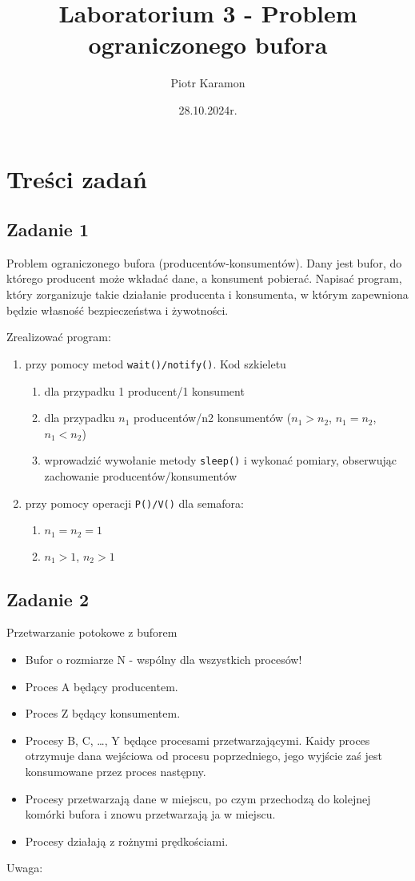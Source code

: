 \documentclass[11pt]{article}
\author{Piotr Karamon}
\date{28.10.2024r.}
\title{Laboratorium 3 - Problem ograniczonego bufora}
\begin{document}
\maketitle
\section*{Treści zadań}
\label{sec:org3d0abb9}
\subsection*{Zadanie 1}
\label{sec:org9805b07}
Problem ograniczonego bufora (producentów-konsumentów). Dany jest bufor, do
którego producent może wkładać dane, a konsument pobierać. Napisać program,
który zorganizuje takie działanie producenta i konsumenta, w którym zapewniona
będzie własność bezpieczeństwa i żywotności.

Zrealizować program:

\begin{enumerate}
\item przy pomocy metod \texttt{wait()/notify()}. Kod szkieletu
\begin{enumerate}
\item dla przypadku 1 producent/1 konsument
\item dla przypadku \(n_1\) producentów/n2 konsumentów (\(n_1>n_2\), \(n_1=n_2\), \(n_1<n_2\))
\item wprowadzić wywołanie metody \texttt{sleep()} i wykonać pomiary, obserwując zachowanie producentów/konsumentów
\end{enumerate}
\item przy pomocy operacji \texttt{P()/V()} dla semafora:
\begin{enumerate}
\item \(n_1=n_2=1\)
\item \(n_1>1\), \(n_2>1\)
\end{enumerate}
\end{enumerate}
\subsection*{Zadanie 2}
\label{sec:org2964ec8}
Przetwarzanie potokowe z buforem
\begin{itemize}
\item Bufor o rozmiarze N - wspólny dla wszystkich procesów!
\item Proces A będący producentem.
\item Proces Z będący konsumentem.
\item Procesy B, C, \ldots{}, Y będące procesami przetwarzającymi. Kaidy proces otrzymuje dana wejściowa od procesu poprzedniego, jego wyjście zaś jest konsumowane przez proces następny.
\item Procesy przetwarzają dane w miejscu, po czym przechodzą do kolejnej komórki bufora i znowu przetwarzają ja w miejscu.
\item Procesy działają z rożnymi prędkościami.
\end{itemize}
Uwaga:
\end{document}
